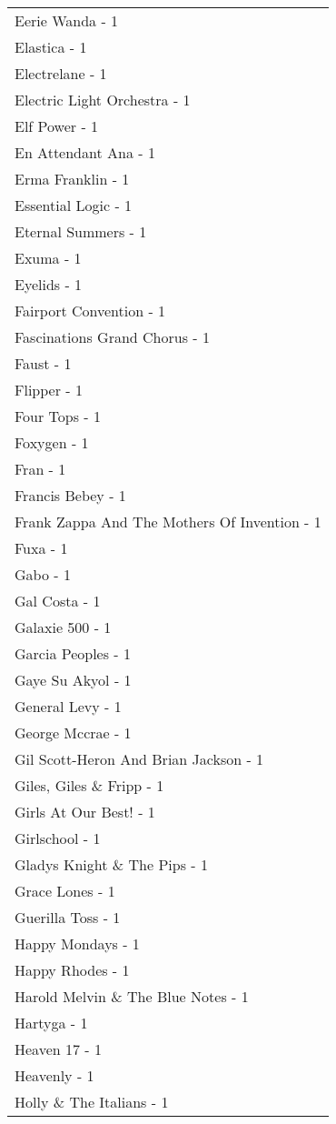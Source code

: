 \documentclass[
]{article}
\begin{document}
\begin{longtable}{l}
Eerie Wanda - 1 \\ 
Elastica - 1 \\ 
Electrelane - 1 \\ 
Electric Light Orchestra - 1 \\ 
Elf Power - 1 \\ 
En Attendant Ana - 1 \\ 
Erma Franklin - 1 \\ 
Essential Logic - 1 \\ 
Eternal Summers - 1 \\ 
Exuma - 1 \\ 
Eyelids - 1 \\ 
Fairport Convention - 1 \\ 
Fascinations Grand Chorus - 1 \\ 
Faust - 1 \\ 
Flipper - 1 \\ 
Four Tops - 1 \\ 
Foxygen - 1 \\ 
Fran - 1 \\ 
Francis Bebey - 1 \\ 
Frank Zappa And The Mothers Of Invention - 1 \\ 
Fuxa - 1 \\ 
Gabo - 1 \\ 
Gal Costa - 1 \\ 
Galaxie 500 - 1 \\ 
Garcia Peoples - 1 \\ 
Gaye Su Akyol - 1 \\ 
General Levy - 1 \\ 
George Mccrae - 1 \\ 
Gil Scott-Heron And Brian Jackson - 1 \\ 
Giles, Giles \& Fripp - 1 \\ 
Girls At Our Best! - 1 \\ 
Girlschool - 1 \\ 
Gladys Knight \& The Pips - 1 \\ 
Grace Lones - 1 \\ 
Guerilla Toss - 1 \\ 
Happy Mondays - 1 \\ 
Happy Rhodes - 1 \\ 
Harold Melvin \& The Blue Notes - 1 \\ 
Hartyga - 1 \\ 
Heaven 17 - 1 \\ 
Heavenly - 1 \\ 
Holly \& The Italians - 1 \\ 

\end{longtable}
\end{document}
